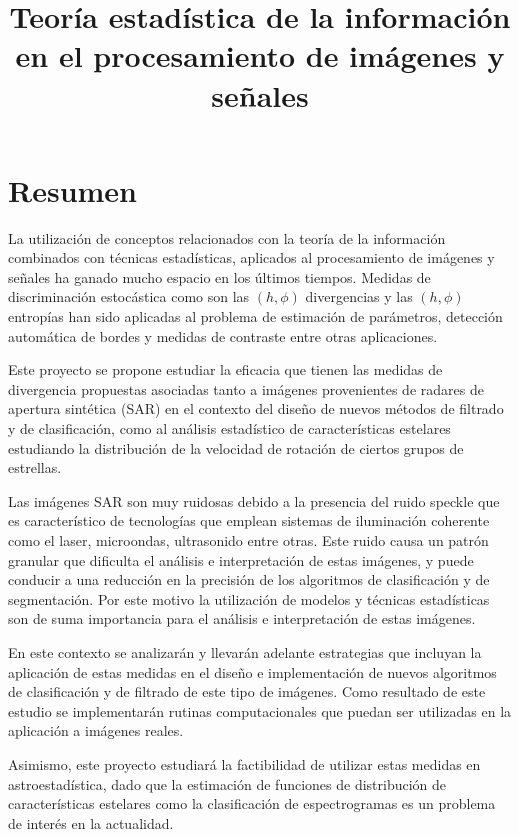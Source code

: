 \documentclass[11pt]{article}
\title{\textbf{Teoría estadística de la información \\en el procesamiento de imágenes y señales}}
\date{}
\begin{document}
	
	\maketitle

\section{Resumen}
La utilización de conceptos relacionados con la teoría de la información combinados con técnicas estadísticas, aplicados al procesamiento de imágenes y señales ha ganado mucho espacio en los últimos tiempos. Medidas de discriminación estocástica como son las $(h,\phi)$ divergencias y las $(h,\phi)$ entropías han sido aplicadas al problema de estimación de parámetros, detección automática de bordes y medidas de contraste entre otras aplicaciones. 

Este proyecto se propone estudiar la eficacia que tienen las medidas de divergencia propuestas asociadas tanto a imágenes provenientes de radares de apertura sintética (SAR) en el contexto del diseño de nuevos métodos de filtrado y de clasificación, como al análisis estadístico de características estelares estudiando la distribución de la velocidad de rotación de ciertos grupos de estrellas. 

Las imágenes SAR son muy ruidosas debido a la presencia del ruido speckle que es característico de tecnologías que emplean sistemas de iluminación coherente como el laser, microondas, ultrasonido entre otras. Este ruido causa un patrón granular que dificulta el análisis e interpretación de estas imágenes, y puede conducir a una reducción en la precisión de los algoritmos de clasificación y de segmentación. Por este motivo la utilización de modelos y técnicas estadísticas son de suma importancia para el análisis e interpretación de estas imágenes.

En este contexto se analizarán y llevarán adelante estrategias que incluyan la aplicación de estas medidas en el diseño e implementación de nuevos algoritmos de clasificación y de filtrado de este tipo de imágenes. Como resultado de este estudio se implementarán rutinas computacionales que puedan ser utilizadas en la aplicación a imágenes reales.

Asimismo, este proyecto estudiará la factibilidad de utilizar estas medidas en astroestadística,  dado que la estimación de funciones de distribución de características estelares como la clasificación de espectrogramas es un problema de interés en la actualidad. 
\end{document}
